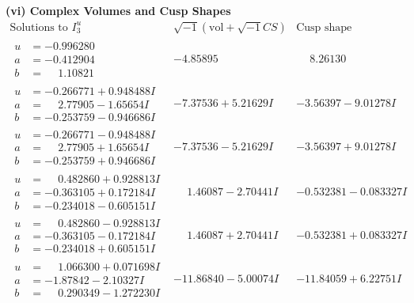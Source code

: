 \documentclass[1p]{elsarticle_modified}
\theoremstyle{definition}
\newcommand{\I}{\sqrt{-1}}
\begin{document}
\newpage\flushleft \textbf{(vi) Complex Volumes and Cusp Shapes}
$$\begin{array}{c|c|c}  
\text{Solutions to }I^u_{3}& \I (\text{vol} + \sqrt{-1}CS) & \text{Cusp shape}\\
 \hline 
\begin{aligned}
u &= -0.996280\phantom{ +0.000000I} \\
a &= -0.412904\phantom{ +0.000000I} \\
b &= \phantom{-}1.10821\phantom{ +0.000000I}\end{aligned}
 & -4.85895\phantom{ +0.000000I} & \phantom{-}8.26130\phantom{ +0.000000I} \\ \hline\begin{aligned}
u &= -0.266771 + 0.948488 I \\
a &= \phantom{-}2.77905 - 1.65654 I \\
b &= -0.253759 - 0.946686 I\end{aligned}
 & -7.37536 + 5.21629 I & -3.56397 - 9.01278 I \\ \hline\begin{aligned}
u &= -0.266771 - 0.948488 I \\
a &= \phantom{-}2.77905 + 1.65654 I \\
b &= -0.253759 + 0.946686 I\end{aligned}
 & -7.37536 - 5.21629 I & -3.56397 + 9.01278 I \\ \hline\begin{aligned}
u &= \phantom{-}0.482860 + 0.928813 I \\
a &= -0.363105 + 0.172184 I \\
b &= -0.234018 - 0.605151 I\end{aligned}
 & \phantom{-}1.46087 - 2.70441 I & -0.532381 - 0.083327 I \\ \hline\begin{aligned}
u &= \phantom{-}0.482860 - 0.928813 I \\
a &= -0.363105 - 0.172184 I \\
b &= -0.234018 + 0.605151 I\end{aligned}
 & \phantom{-}1.46087 + 2.70441 I & -0.532381 + 0.083327 I \\ \hline\begin{aligned}
u &= \phantom{-}1.066300 + 0.071698 I \\
a &= -1.87842 - 2.10327 I \\
b &= \phantom{-}0.290349 - 1.272230 I\end{aligned}
 & -11.86840 - 5.00074 I & -11.84059 + 6.22751 I \\ \hline\begin{aligned}

\end{aligned}
\end{array}$$
\end{document}
